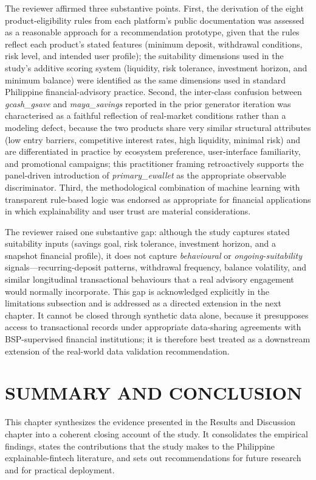 \documentclass{icsthesis}
\begin{document}
\begin{mainmatter}
				The reviewer affirmed three substantive points. First, the derivation of the eight product-eligibility rules from each platform's public documentation was assessed as a reasonable approach for a recommendation prototype, given that the rules reflect each product's stated features (minimum deposit, withdrawal conditions, risk level, and intended user profile); the suitability dimensions used in the study's additive scoring system (liquidity, risk tolerance, investment horizon, and minimum balance) were identified as the same dimensions used in standard Philippine financial-advisory practice. Second, the inter-class confusion between \emph{gcash\_gsave} and \emph{maya\_savings} reported in the prior generator iteration was characterised as a faithful reflection of real-market conditions rather than a modeling defect, because the two products share very similar structural attributes (low entry barriers, competitive interest rates, high liquidity, minimal risk) and are differentiated in practice by ecosystem preference, user-interface familiarity, and promotional campaigns; this practitioner framing retroactively supports the panel-driven introduction of \emph{primary\_ewallet} as the appropriate observable discriminator. Third, the methodological combination of machine learning with transparent rule-based logic was endorsed as appropriate for financial applications in which explainability and user trust are material considerations.

				The reviewer raised one substantive gap: although the study captures stated suitability inputs (savings goal, risk tolerance, investment horizon, and a snapshot financial profile), it does not capture \emph{behavioural} or \emph{ongoing-suitability} signals---recurring-deposit patterns, withdrawal frequency, balance volatility, and similar longitudinal transactional behaviours that a real advisory engagement would normally incorporate. This gap is acknowledged explicitly in the limitations subsection and is addressed as a directed extension in the next chapter. It cannot be closed through synthetic data alone, because it presupposes access to transactional records under appropriate data-sharing agreements with BSP-supervised financial institutions; it is therefore best treated as a downstream extension of the real-world data validation recommendation.

		\section{SUMMARY AND CONCLUSION}
		This chapter synthesizes the evidence presented in the Results and Discussion chapter into a coherent closing account of the study. It consolidates the empirical findings, states the contributions that the study makes to the Philippine explainable-fintech literature, and sets out recommendations for future research and for practical deployment.


\end{mainmatter}
\end{document}

